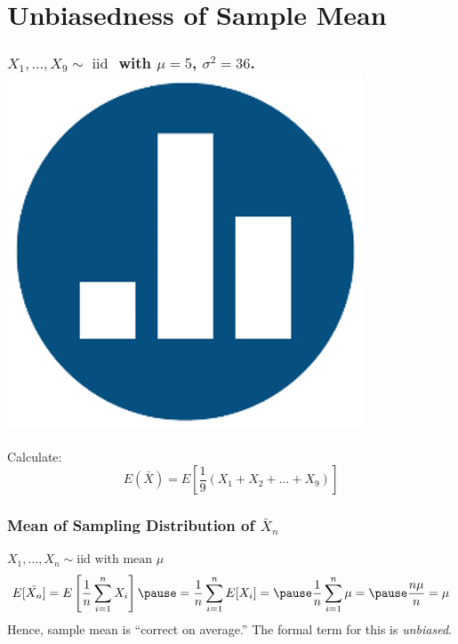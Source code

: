 \documentclass[handout]{beamer}
\begin{document}
\section{Unbiasedness of Sample Mean}
\begin{frame}
\frametitle{$X_1,\hdots, X_{9} \sim \mbox{ iid }$ with $\mu=5$, $\sigma^2 =36$. \hfill\includegraphics[scale = 0.05]{./images/clicker}}

\large Calculate:
	 $$E(\bar{X}) = E\left[\frac{1}{9}(X_1 + X_2 + \hdots + X_{9})\right]$$
\end{frame}
\begin{frame}
\frametitle{Mean of Sampling Distribution of $\bar{X}_n$}
\alert{$X_1, \hdots, X_n \sim \mbox{iid with mean }\mu$}
\begin{eqnarray*}
E[\bar{X_n}] = E\left[ \frac{1}{n}\sum_{i=1}^n X_i \right]\pause = \frac{1}{n} \sum_{i=1}^n E[X_i] = \pause\frac{1}{n} \sum_{i=1}^n \mu = \pause \frac{n\mu}{n} = \mu
\end{eqnarray*}
\alert{Hence, sample mean is ``correct on average.'' The formal term for this is \emph{unbiased}.}
\end{frame}

\end{document}
